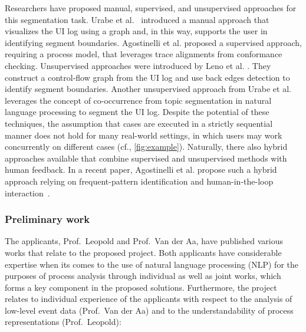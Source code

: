 Researchers have proposed manual, supervised, and unsupervised approaches for this segmentation task. Urabe et al.~\cite{urabe2019visualizing} introduced a manual approach that visualizes the UI log using a graph and, in this way, supports the user in identifying segment boundaries. Agostinelli et al. \cite{agostinelli202111} proposed a supervised approach, requiring a process model, that leverages trace alignments from conformance checking. 
Unsupervised approaches were introduced by Leno et al. \cite{leno2020identifying,leno2022discovering}. They construct a control-flow graph from the UI log and use back edges detection to identify segment boundaries. Another unsupervised approach from Urabe et al. \cite{Urabe21} leverages the concept of co-occurrence from topic segmentation in natural language processing to segment the UI log. Despite the potential of these techniques, 
the assumption that cases are executed in a strictly sequential manner does not hold for many real-world settings, in which users may work concurrently on different cases (cf., \autoref{fig:example}). Naturally, there also hybrid approaches available that combine supervised and unsupervised methods with human feedback. In a recent paper, Agostinelli et al. propose such a hybrid approach relying on  frequent-pattern identification and human-in-the-loop interaction~\cite{agostinelli2022mastering}. 



\subsubsection{Preliminary work}
\label{sec:preliminarywork}

The applicants, Prof.\ Leopold and Prof.\ Van der Aa, have published various works that relate to the proposed project. Both applicants have considerable expertise when its comes to the use of natural language processing (NLP) for the purposes of process analysis through individual as well as joint works, which forms a key component in the proposed solutions.
Furthermore, the project relates to individual experience of the applicants with respect to the analysis of low-level event data (Prof.\ Van der Aa) and to the understandability of process representations (Prof.\ Leopold):


